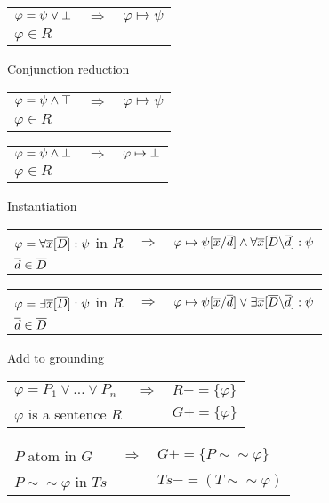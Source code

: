 \documentclass{article}
\newcommand{\DDD}{\ensuremath{\overline{D}}}
\begin{document}
\begin{tabular}{|lcl|} \hline
$\varphi=\psi \lor \bot$ & $\Longrightarrow$ & $\varphi \mapsto \psi$ \\
$\varphi \in R$ &&\\
\hline
\end{tabular}

\noindent Conjunction reduction

\begin{tabular}{|lcl|} \hline
$\varphi=\psi \land \top$ & $\Longrightarrow$ & $\varphi \mapsto \psi$ \\
$\varphi \in R$ &&\\
\hline
\end{tabular}

\begin{tabular}{|lcl|} \hline
$\varphi=\psi \land \bot$ & $\Longrightarrow$ & $\varphi \mapsto \bot$ \\
$\varphi \in R$ &&\\
\hline
\end{tabular}

\noindent Instantiation

\begin{tabular}{|lcl|} \hline
$\varphi = \forall \xxx[\DDD]: \psi$ in $R$ & $\Longrightarrow$ & $\varphi \mapsto \psi[\xxx\subs\ddd] \land \forall \xxx[\DDD\elim\ddd]: \psi$\\
$\ddd \in \DDD$ && \\
\hline
\end{tabular}

\begin{tabular}{|lcl|} \hline
$\varphi = \exists \xxx[\DDD]: \psi$ in $R$ & $\Longrightarrow$ & $\varphi \mapsto \psi[\xxx\subs\ddd] \lor \exists \xxx[\DDD\elim\ddd]: \psi$\\
$\ddd \in \DDD$ && \\
\hline
\end{tabular}

\noindent Add to grounding

\begin{tabular}{|lcl|} \hline
$\varphi = P_1 \lor \ldots \lor P_n$ & $\Longrightarrow$ & $R-=\{\varphi\}$ \\
$\varphi$ is a sentence $R$ && $G+=\{\varphi\}$\\
\hline
\end{tabular}

\begin{tabular}{|lcl|} \hline
$P$ atom in $G$ & $\Longrightarrow$ & $G+=\{P \sim\sim \varphi\}$ \\
$P \sim\sim \varphi$ in $Ts$ && $Ts -= (T \sim\sim \varphi)$\\
\hline
\end{tabular}
\end{document}
